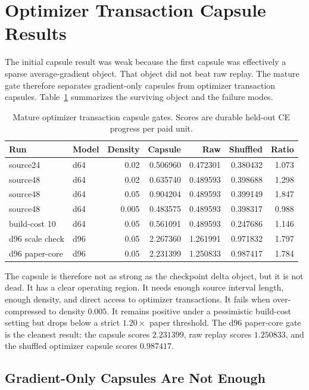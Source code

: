 \documentclass{article}
\begin{document}
\section{Optimizer Transaction Capsule Results}

The initial capsule result was weak because the first capsule was effectively a
sparse average-gradient object. That object did not beat raw replay. The mature
gate therefore separates gradient-only capsules from optimizer transaction
capsules. Table~\ref{tab:capsule_mature} summarizes the surviving object and
the failure modes.

\begin{table}[t]
  \centering
  \caption{Mature optimizer transaction capsule gates. Scores are durable
  held-out CE progress per paid unit.}
  \label{tab:capsule_mature}
  \begin{tabular}{llrrrrr}
    \toprule
    Run & Model & Density & Capsule & Raw & Shuffled & Ratio \\
    \midrule
    source24 & d64 & 0.02 & 0.506960 & 0.472301 & 0.380432 & 1.073 \\
    source48 & d64 & 0.02 & 0.635740 & 0.489593 & 0.398688 & 1.298 \\
    source48 & d64 & 0.05 & 0.904204 & 0.489593 & 0.399149 & 1.847 \\
    source48 & d64 & 0.005 & 0.483575 & 0.489593 & 0.398317 & 0.988 \\
    build-cost 10 & d64 & 0.05 & 0.561091 & 0.489593 & 0.247686 & 1.146 \\
    d96 scale check & d96 & 0.05 & 2.267360 & 1.261991 & 0.971832 & 1.797 \\
    d96 paper-core & d96 & 0.05 & 2.231399 & 1.250833 & 0.987417 & 1.784 \\
    \bottomrule
  \end{tabular}
\end{table}

The capsule is therefore not as strong as the checkpoint delta object, but it
is not dead. It has a clear operating region. It needs enough source interval
length, enough density, and direct access to optimizer transactions. It fails
when over-compressed to density $0.005$. It remains positive under a
pessimistic build-cost setting but drops below a strict $1.20\times$ paper
threshold. The d96 paper-core gate is the cleanest result: the capsule scores
$2.231399$, raw replay scores $1.250833$, and the shuffled optimizer capsule
scores $0.987417$.

\subsection{Gradient-Only Capsules Are Not Enough}
\end{document}

